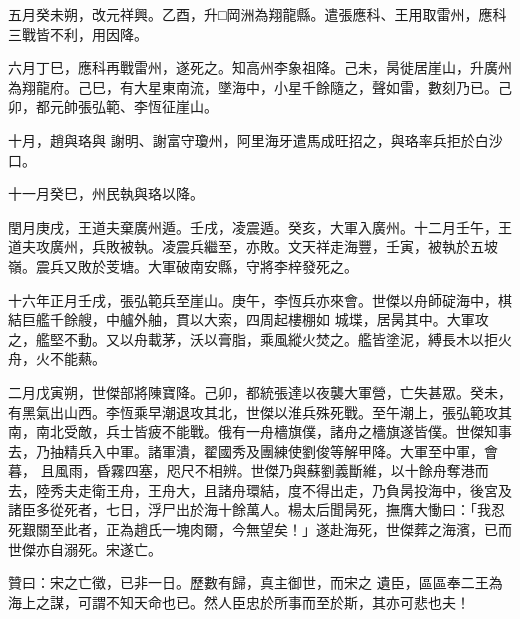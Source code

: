 \begin{pinyinscope}
 五月癸未朔，改元祥興。乙酉，升□岡洲為翔龍縣。遣張應科、王用取雷州，應科三戰皆不利，用因降。



 六月丁巳，應科再戰雷州，遂死之。知高州李象祖降。己未，昺徙居崖山，升廣州為翔龍府。己巳，有大星東南流，墜海中，小星千餘隨之，聲如雷，數刻乃已。己卯，都元帥張弘範、李恆征崖山。



 十月，趙與珞與
 謝明、謝富守瓊州，阿里海牙遣馬成旺招之，與珞率兵拒於白沙口。



 十一月癸巳，州民執與珞以降。



 閏月庚戌，王道夫棄廣州遁。壬戌，凌震遁。癸亥，大軍入廣州。十二月壬午，王道夫攻廣州，兵敗被執。凌震兵繼至，亦敗。文天祥走海豐，壬寅，被執於五坡嶺。震兵又敗於芰塘。大軍破南安縣，守將李梓發死之。



 十六年正月壬戌，張弘範兵至崖山。庚午，李恆兵亦來會。世傑以舟師碇海中，棋結巨艦千餘艘，中艫外舳，貫以大索，四周起樓棚如
 城堞，居昺其中。大軍攻之，艦堅不動。又以舟載茅，沃以膏脂，乘風縱火焚之。艦皆塗泥，縛長木以拒火舟，火不能爇。



 二月戊寅朔，世傑部將陳寶降。己卯，都統張達以夜襲大軍營，亡失甚眾。癸未，有黑氣出山西。李恆乘早潮退攻其北，世傑以淮兵殊死戰。至午潮上，張弘範攻其南，南北受敵，兵士皆疲不能戰。俄有一舟檣旗僕，諸舟之檣旗遂皆僕。世傑知事去，乃抽精兵入中軍。諸軍潰，翟國秀及團練使劉俊等解甲降。大軍至中軍，會暮，
 且風雨，昏霧四塞，咫尺不相辨。世傑乃與蘇劉義斷維，以十餘舟奪港而去，陸秀夫走衛王舟，王舟大，且諸舟環結，度不得出走，乃負昺投海中，後宮及諸臣多從死者，七日，浮尸出於海十餘萬人。楊太后聞昺死，撫膺大慟曰：「我忍死艱關至此者，正為趙氏一塊肉爾，今無望矣！」遂赴海死，世傑葬之海濱，已而世傑亦自溺死。宋遂亡。



 贊曰：宋之亡徵，已非一日。歷數有歸，真主御世，而宋之
 遺臣，區區奉二王為海上之謀，可謂不知天命也已。然人臣忠於所事而至於斯，其亦可悲也夫！



\end{pinyinscope}